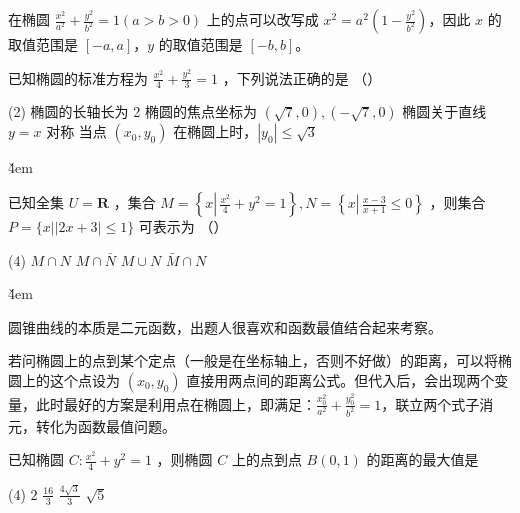 \begin{theorem}[椭圆的范围]
    在椭圆 $\frac{x^2}{a^2}+\frac{y^2}{b^2}=1(a>b>0)$ 上的点可以改写成 $x^2=a^2 (1-\frac{y^2}{b^2})$，因此 $x$ 的取值范围是 $[-a, a]$，$y$ 的取值范围是 $[-b, b]$。
\end{theorem}

\begin{example}
    已知椭圆的标准方程为 $\frac{x^2}{4}+\frac{y^2}{3}=1$ ，下列说法正确的是 （\qquad）
    \begin{tasks}(2)
        \task 椭圆的长轴长为 2
        \task 椭圆的焦点坐标为 $(\sqrt{7}, 0),(-\sqrt{7}, 0)$
        \task 椭圆关于直线 $y=x$ 对称
        \task 当点 $\left(x_0, y_0\right)$ 在椭圆上时，$\left|y_0\right| \leq \sqrt{3}$
    \end{tasks}
\end{example}

\v{4em}

\begin{example}
    已知全集 $U=\mathbf{R}$ ，集合 $M=\left\{x \left\lvert\, \frac{x^2}{4}+y^2=1\right.\right\}, N=\left\{x \left\lvert\, \frac{x-3}{x+1} \leq 0\right.\right\}$ ，则集合 $P=\{x| | 2 x+3 \mid \leq 1\}$ 可表示为 （\qquad）
    \begin{tasks}(4)
        \task $M \cap N$
        \task $M \cap \bar{N}$
        \task $M \cup N$
        \task $\bar{M} \cap N$
    \end{tasks}
\end{example}

\v{4em}

\begin{warning}
    圆锥曲线的本质是二元函数，出题人很喜欢和函数最值结合起来考察。
\end{warning}

\begin{tips}
    若问椭圆上的点到某个定点（一般是在坐标轴上，否则不好做）的距离，可以将椭圆上的这个点设为 $(x_0,y_0)$ 直接用两点间的距离公式。但代入后，会出现两个变量，此时最好的方案是利用点在椭圆上，即满足：$\frac{x_0^{2}}{a^2}+\frac{y_0^{2}}{b^2}=1$，联立两个式子消元，转化为函数最值问题。
\end{tips}

\begin{example}
    已知椭圆 $C: \frac{x^{2}}{4}+y^{2}=1$ ，则椭圆 $C$ 上的点到点 $B(0,1)$ 的距离的最大值是
    \begin{tasks}(4)
        \task $2$
        \task $\frac{16}{3}$
        \task $\frac{4 \sqrt{3}}{3}$
        \task $\sqrt{5}$
    \end{tasks}
\end{example}

